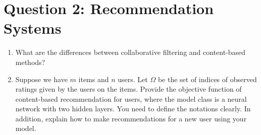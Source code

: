 \documentclass[
	12pt, %
]{fphw}
\begin{document}

\section*{Question 2: Recommendation Systems}

\begin{problem}
	\begin{enumerate}
	\itemsep0.3em
	\parskip0.3em
	\item What are the differences between collaborative filtering and content-based methods? 
    


    \item Suppose we have $m$ items and $n$ users. Let $\Omega$ be the set of indices of observed ratings given by the users on the items. Provide the objective function of content-based recommendation for users, where the model class is a neural network with two hidden layers. You need to define the notations clearly. In addition, explain how to make recommendations for a new user using your model. 
\end{enumerate}
  
	


\end{problem}

\end{document}
